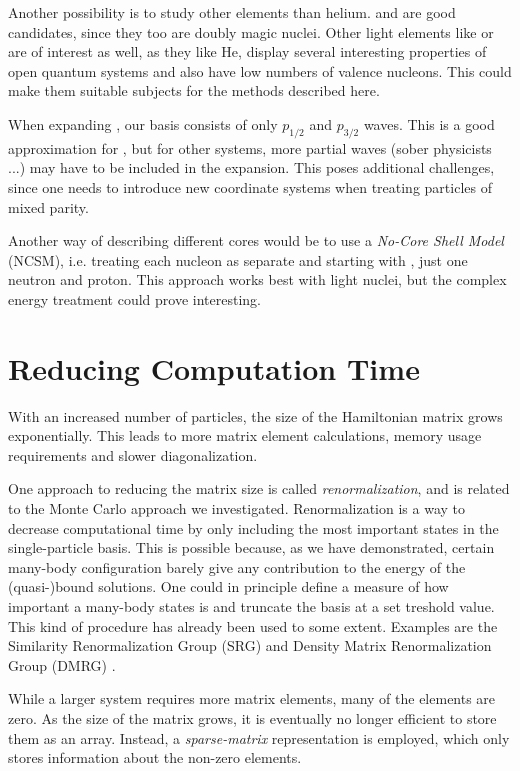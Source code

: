 \documentclass[../main/report.tex]{subfiles}
\begin{document}
Another possibility is to study other elements than helium.  and  are good candidates, since they too are doubly magic nuclei.
Other light elements like  or  are of interest as well, as they like He, display several interesting properties of open quantum systems and also have low numbers of valence nucleons. 
This could make them suitable subjects for the methods described here.

When expanding , our basis consists of only $p_{1/2}$ and $p_{3/2}$ waves. 
This is a good approximation for  \cite{gamow_shell_model_2008},  but for other systems, more partial waves (sober physicists ...) may have to be included in the expansion.
This poses additional challenges, since one needs to introduce new coordinate systems when treating particles of mixed parity. 

Another way of describing different cores would be to use a \emph{No-Core Shell Model} (NCSM), i.e. treating each nucleon as separate and starting with , just one neutron and proton. 
This approach works best with light nuclei, but the complex energy treatment could prove interesting.

\section{Reducing Computation Time}
With an increased number of particles, the size of the Hamiltonian matrix grows exponentially. This leads to more matrix element calculations, memory usage requirements and slower diagonalization.

One approach to reducing the matrix size is called \emph{renormalization}, and is related to the Monte Carlo approach we investigated. 
Renormalization is a way to decrease computational time by only including the most important states in the single-particle basis.
This is possible because, as we have demonstrated, certain many-body configuration barely give any contribution to the energy of the (quasi-)bound solutions. 
One could in principle define a  measure of how important a many-body states is and truncate the basis at a set treshold value. 
This kind of procedure has already been used to some extent. 
Examples are the Similarity Renormalization Group (SRG) and Density Matrix Renormalization Group (DMRG) \cite{DMRG}. 


While a larger system requires more matrix elements, many of the elements are zero. 
As the size of the matrix grows, it is eventually no longer efficient to store them as an array. 
Instead, a \emph{sparse-matrix} representation is employed, which only stores information about the non-zero elements. 
\end{document}
